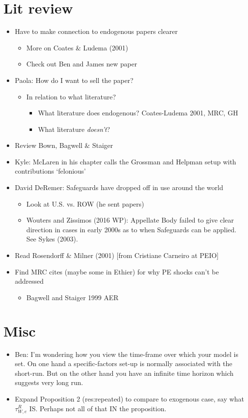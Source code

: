 \documentclass[12pt]{article}
\begin{document}
\section{Lit review}
\begin{itemize}
	\item Have to make connection to endogenous papers clearer
		\begin{itemize}
			\item More on Coates $\&$ Ludema (2001)
			\item Check out Ben and James new paper
		\end{itemize}
	\item Paola: How do I want to sell the paper?
		\begin{itemize}
			\item In relation to what literature?
				\begin{itemize}
					\item What literature does endogenous? Coates-Ludema 2001, MRC, GH
					\item What literature \textit{doesn't}?
				\end{itemize}
			\end{itemize}
	\item Review Bown, Bagwell $\&$ Staiger
	\item Kyle: McLaren in his chapter calls the Grossman and Helpman setup with contributions `felonious'
	\item David DeRemer: Safeguards have dropped off in use around the world
		\begin{itemize}
			\item Look at U.S. vs. ROW (he sent papers)
			\item Wouters and Zissimos (2016 WP): Appellate Body failed to give clear direction in cases in early 2000s as to when Safeguards can be applied. See Sykes (2003).
		\end{itemize}
	\item Read Rosendorff $\&$ Milner (2001) [from Cristiane Carneiro at PEIO]
	\item Find MRC cites (maybe some in Ethier) for why PE shocks can't be addressed
		\begin{itemize}
			\item Bagwell and Staiger 1999 AER
		\end{itemize}
\end{itemize}


\section{Misc}
\begin{itemize}
	\item Ben: I'm wondering how you view the time-frame over which your model is set.  On one hand a specific-factors set-up is normally associated with the short-run.  But on the other hand you have an infinite time horizon which suggests very long run.
	\item Expand Proposition 2 (res:repeated) to compare to exogenous case, say what $\tau^R_{W,e}$ IS. Perhaps not all of that IN the proposition.
\end{itemize}
\end{document}
